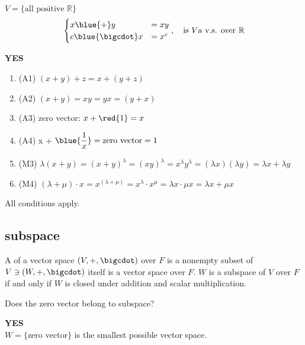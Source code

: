 \begin{exercise}
    $V = \{ \text{all positive } \mathbb{R} \}$ 
    \[
    \begin{cases}
        x \blue{+} y &= xy \\
        c \blue{\bigcdot} x &= x^c
    \end{cases}, \quad \text{is } V \text{a v.s. over } \mathbb{R}
    \]
\end{exercise}
\begin{answer}
    \textbf{YES}
    \begin{enumerate}[label=$\arabic*^\circ$]
        \item (A1) $(x+y)+z = x+(y+z)$
        \item (A2) $(x+y) = xy = yx = (y+x)$
        \item (A3) zero vector: $x + \red{1} = x$
        \item (A4) x + $\displaystyle \blue{\frac{1}{x}} = \text{zero vector} = 1$
        \item (M3) $\lambda(x+y) = (x+y)^\lambda = (xy)^\lambda = x^\lambda y^\lambda = (\lambda x)(\lambda y) = \lambda x + \lambda y$
        \item (M4) $(\lambda + \mu) \cdot x = x^{(\lambda + \mu)} = x^\lambda\cdot x^\mu = \lambda x \cdot \mu x = \lambda x + \mu x$
    \end{enumerate}
    All conditions apply.
\end{answer}

\newpage

\subsection{subspace}

\begin{definition}[subspace]
    A  of a vector space $(V, +, \bigcdot)$ over $F$ is a nonempty subset of $V \ni (W, + , \bigcdot)$ itself is a vector space over $F$. $W$ is a subspace of $V$ over $F$ if and only if $W$ is closed under addition and scalar multiplication.
\end{definition}

\begin{exercise}
    Does the zero vector belong to subspace?
\end{exercise}
\begin{answer}
    \textbf{YES} \\
    $W = \{ \text{zero vector} \}$ is the smallest possible vector space.
\end{answer}

